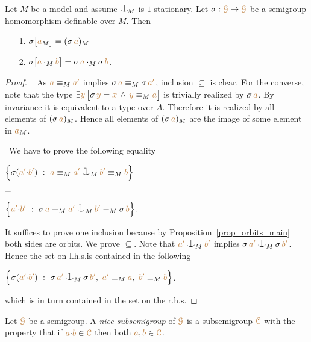 \documentclass[creche.tex]{subfiles}
\begin{document}
\begin{proposition}\label{prop_HJ_tecnical}
Let $M$ be a model and assume $\nonforkc_{\!M}$ is $1$-stationary.
Let $\sigma:{\color{brown}\EuScript G}\to{\color{brown}\EuScript G}$ be a semigroup homomorphism definable over $M$.
Then 
\begin{itemize}
\item[1.] $\sigma\big[{\color{brown} a}_M\big]=(\sigma\,{\color{brown} a})_M$

\item[2.]
$\sigma\big[{\color{brown} a}\cdot_M{\color{brown} b}\big]=\sigma\,{\color{brown} a}\cdot_M\sigma\,{\color{brown} b}$.
\end{itemize}
\end{proposition}
\begin{proof}\   
As ${\color{brown} a}\equiv_M{\color{brown} a'}$ implies $\sigma\,{\color{brown} a}\equiv_M\sigma\,{\color{brown} a'}$,
inclusion $\subseteq$ is clear. 
For the converse, note that the type 
$\exists{\color{brown}y}\,\big[\sigma\,{\color{brown} y}={\color{brown} x}\,\wedge\,{\color{brown} y}\equiv_M{\color{brown} a}\big]$ 
is trivially realized by $\sigma\,{\color{brown} a}$.
By invariance it is equivalent to a type over $A$.
Therefore it is realized by all elements of $(\sigma\,{\color{brown} a})_M$.
Hence all elements of $(\sigma\,{\color{brown} a})_M$ are the image of some element in ${\color{brown} a}_M$.

\def\medrel#1{\parbox[t]{6ex}{$\displaystyle\hfil #1$}}
\def\ceq#1#2#3{\parbox[t]{39ex}{$\displaystyle #1$}\medrel{#2}{$\displaystyle #3$}}
 \  
We have to prove the following equality\smallskip

\ceq{\hfill\Big\{\sigma({\mr a'}{\cdot}{\mr b'})\ :\ {\mr a}\equiv_M{\mr a'}\cnonfork_M{\mr b'}\equiv_M{\mr b} \Big\}}
{=}
{\Big\{{\mr a'}{\cdot}{\mr b'}\ :\ \sigma\,{\mr a}\equiv_M{\mr a'}\cnonfork_M{\mr b'}\equiv_M\sigma\,{\mr b} \Big\}.}\smallskip

It suffices to prove one inclusion because by Proposition~\ref{prop_orbits_main} both sides are orbits. 
We prove $\subseteq$. 
Note that ${\mr a'}\cnonfork_M{\mr b'}$ implies $\sigma\,{\mr a'}\cnonfork_M\sigma\,{\mr b'}$.
Hence the set on l.h.s.\@ is contained in the following\smallskip

\hfil$\Big\{\sigma({\mr a'}{\cdot}{\mr b'})\ :\ \sigma\,{\mr a'}\cnonfork_M\sigma\,{\mr b'},\ {\mr a'}\equiv_M{\mr a},\  {\mr b'}\equiv_M{\mr b} \Big\}$.\smallskip

which is in turn contained in the set on the r.h.s.
\end{proof}


Let ${\color{brown}\EuScript G}$ be a semigroup.
A \emph{nice subsemigroup\/} of ${\color{brown}\EuScript G}$ is a subsemigroup ${\color{brown}\EuScript C}$ with the property that if ${\color{brown} a}{\cdot}{\color{brown} b}\in{\color{brown}\EuScript C}$ then both ${\color{brown} a},{\color{brown} b}\in {\color{brown}\EuScript C}$.
\end{document}
